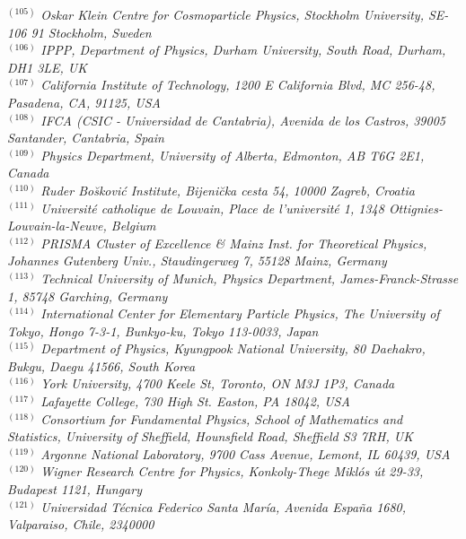 {\begin{center}
$^{(105)}$ \emph{Oskar Klein Centre for Cosmoparticle Physics, Stockholm University, SE-106 91 Stockholm, Sweden}\\
$^{(106)}$ \emph{IPPP, Department of Physics, Durham University, South Road, Durham, DH1 3LE, UK}\\
$^{(107)}$ \emph{California Institute of Technology, 1200 E California Blvd, MC 256-48, Pasadena, CA, 91125, USA}\\
$^{(108)}$ \emph{IFCA (CSIC - Universidad de Cantabria), Avenida de los Castros, 39005 Santander, Cantabria, Spain}\\
$^{(109)}$ \emph{Physics Department, University of Alberta, Edmonton,  AB T6G 2E1, Canada}\\
$^{(110)}$ \emph{Ruder Bo\u skovi\'c Institute, Bijeni\u cka cesta 54, 10000 Zagreb, Croatia}\\
$^{(111)}$ \emph{Universit\'e catholique de Louvain, Place de l'universit\'e 1, 1348 Ottignies-Louvain-la-Neuve, Belgium}\\
$^{(112)}$ \emph{PRISMA Cluster of Excellence \& Mainz Inst. for Theoretical Physics, Johannes Gutenberg Univ., Staudingerweg 7,  55128 Mainz, Germany}\\
$^{(113)}$ \emph{Technical University of Munich, Physics Department, James-Franck-Strasse 1, 85748 Garching, Germany}\\
$^{(114)}$ \emph{International Center for Elementary Particle Physics, The University of Tokyo, Hongo 7-3-1, Bunkyo-ku, Tokyo 113-0033, Japan}\\
$^{(115)}$ \emph{Department of Physics, Kyungpook National University,  80 Daehakro, Bukgu, Daegu 41566, South Korea}\\
$^{(116)}$ \emph{York University, 4700 Keele St, Toronto, ON M3J 1P3, Canada }\\
$^{(117)}$ \emph{Lafayette College, 730 High St. Easton, PA 18042, USA}\\
$^{(118)}$ \emph{Consortium for Fundamental Physics, School of Mathematics and Statistics, University of Sheffield, Hounsfield Road, Sheffield S3 7RH, UK}\\
$^{(119)}$ \emph{Argonne National Laboratory, 9700 Cass Avenue, Lemont, IL 60439, USA}\\
$^{(120)}$ \emph{Wigner Research Centre for Physics, Konkoly-Thege Mikl\'os \'ut 29-33, Budapest 1121, Hungary}\\
$^{(121)}$ \emph{Universidad T\'ecnica Federico Santa Mar\'ia, Avenida Espa\~na 1680, Valparaiso, Chile, 2340000}\\

\end{center}}
